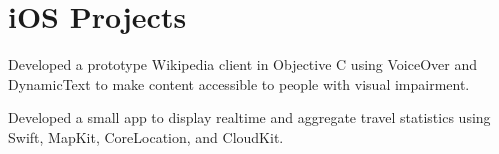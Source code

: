 \documentclass[]{jhearn-resume}
\begin{document}
\begin{minipage}[t]{0.64\textwidth}
\begin{tightemize}
\end{tightemize}
\sectionsep

\section{\lowercase{i}OS Projects}
\begin{tightemize}
\item Developed a prototype Wikipedia client in Objective C using VoiceOver and DynamicText to make content accessible to people with visual impairment.
\end{tightemize}
\sectionsep

\begin{tightemize}
\item Developed a small app to display realtime and aggregate travel statistics using Swift, MapKit, CoreLocation, and CloudKit.
\end{tightemize}
\sectionsep


\end{minipage} 
\hfill
\end{document}
